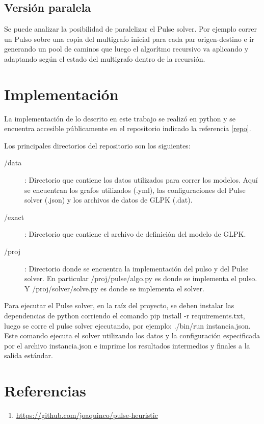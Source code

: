 \documentclass{article}
\begin{document}
  \subsection*{Versión paralela}

  Se puede analizar la posibilidad de paralelizar el Pulse solver. Por ejemplo correr un Pulso sobre una copia del multigrafo inicial para cada par origen-destino e ir generando un pool de caminos que luego el algorítmo recursivo va aplicando y adaptando según el estado del multigrafo dentro de la recursión.

  \section*{Implementación}

  La implementación de lo descrito en este trabajo se realizó en python y se encuentra accesible públicamente en el repositorio indicado la referencia \ref{repo}.

  Los principales directorios del repositorio son los siguientes:

  \begin{description}
    \item[/data]: Directorio que contiene los datos utilizados para correr los modelos. Aquí se encuentran los grafos utilizados (.yml), las configuraciones del Pulse solver (.json) y los archivos de datos de GLPK (.dat).
    \item[/exact]: Directorio que contiene el archivo de definición del modelo de GLPK. 
    \item[/proj]: Directorio donde se encuentra la implementación del pulso y del Pulse solver. En particular /proj/pulse/algo.py es donde se implementa el pulso. Y /proj/solver/solve.py es donde se implementa el solver.
  \end{description}

  Para ejecutar el Pulse solver, en la raíz del proyecto, se deben instalar las dependencias de python corriendo el comando pip install -r requirements.txt, luego se corre el pulse solver ejecutando, por ejemplo: ./bin/run instancia.json. Este comando ejecuta el solver utilizando los datos y la configuración especificada por el archivo instancia.json e imprime los resultados intermedios y finales a la salida estándar.

  \section*{Referencias}

  \begin{enumerate}
    \item{ \label{repo} \url{https://github.com/joaquinco/pulse-heuristic}}
  \end{enumerate}
\end{document}
